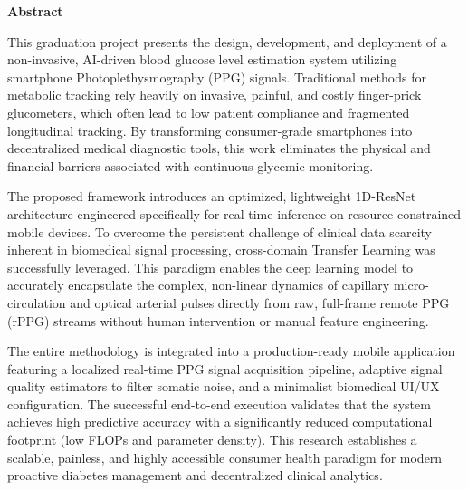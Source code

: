 \noindent
{\textbf{\Huge Abstract}}
\vspace{1cm}

This graduation project presents the design, development, and deployment of a non-invasive, AI-driven blood glucose level estimation system utilizing smartphone Photoplethysmography (PPG) signals. Traditional methods for metabolic tracking rely heavily on invasive, painful, and costly finger-prick glucometers, which often lead to low patient compliance and fragmented longitudinal tracking. By transforming consumer-grade smartphones into decentralized medical diagnostic tools, this work eliminates the physical and financial barriers associated with continuous glycemic monitoring.

The proposed framework introduces an optimized, lightweight 1D-ResNet architecture engineered specifically for real-time inference on resource-constrained mobile devices. To overcome the persistent challenge of clinical data scarcity inherent in biomedical signal processing, cross-domain Transfer Learning was successfully leveraged. This paradigm enables the deep learning model to accurately encapsulate the complex, non-linear dynamics of capillary micro-circulation and optical arterial pulses directly from raw, full-frame remote PPG (rPPG) streams without human intervention or manual feature engineering.

The entire methodology is integrated into a production-ready mobile application featuring a localized real-time PPG signal acquisition pipeline, adaptive signal quality estimators to filter somatic noise, and a minimalist biomedical UI/UX configuration. The successful end-to-end execution validates that the system achieves high predictive accuracy with a significantly reduced computational footprint (low FLOPs and parameter density). This research establishes a scalable, painless, and highly accessible consumer health paradigm for modern proactive diabetes management and decentralized clinical analytics.